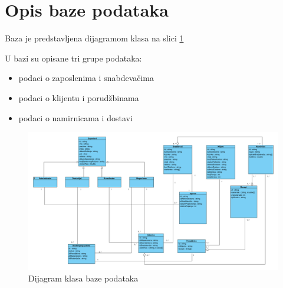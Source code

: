 \section{\bfseries Opis baze podataka}
Baza je predstavljena dijagramom klasa na slici \ref{fig:ClassDiagramDatabase}

U bazi su opisane tri grupe podataka:
\begin{itemize}
    \item podaci o zaposlenima i snabdevačima
    \item podaci o klijentu i porudžbinama
    \item podaci o namirnicama i dostavi
\end{itemize}





\begin{figure}[H]
	\begin{center}
		\includegraphics[width=\textwidth]{Pictures/class_diagram_database.png}

    		\caption{Dijagram klasa baze podataka}
    \label{fig:ClassDiagramDatabase}
    \end{center}
 
\end{figure}
